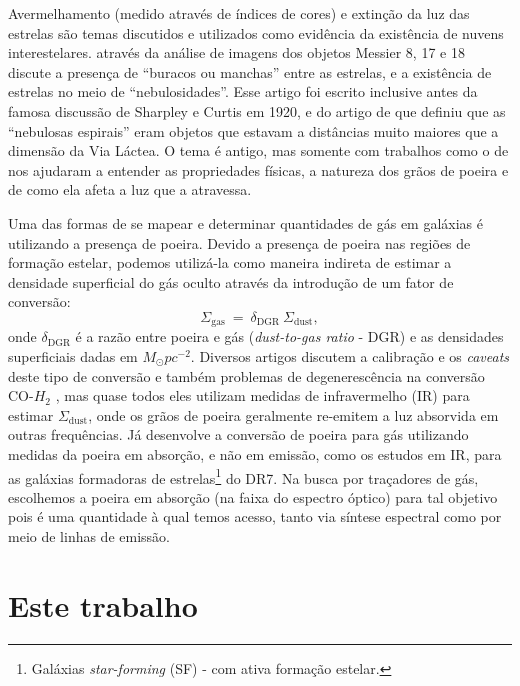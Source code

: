 Avermelhamento (medido através de índices de cores) e extinção da luz das estrelas são temas
discutidos e utilizados como evidência da existência de nuvens interestelares. \citep{Barnard.1908a}
através da análise de imagens dos objetos Messier 8, 17 e 18 discute a presença de ``buracos ou
manchas'' entre as estrelas, e a existência de estrelas no meio de ``nebulosidades''. Esse artigo
foi escrito inclusive antes da famosa discussão de Sharpley e Curtis em 1920, e do artigo de
\citep{Hubble.1925a} que definiu que as ``nebulosas espirais'' eram objetos que estavam a distâncias
muito maiores que a dimensão da Via Láctea. O tema é antigo, mas somente com trabalhos como o de
\citep{Draine.2003a} nos ajudaram a entender as propriedades físicas, a natureza dos grãos de
poeira e de como ela afeta a luz que a atravessa.

Uma das formas de se mapear e determinar quantidades de gás em galáxias é utilizando a presença de
poeira. Devido a presença de poeira nas regiões de formação estelar, podemos utilizá-la como maneira
indireta de estimar a densidade superficial do gás oculto através da introdução de um fator de
conversão:
\begin{equation}
	\label{eq:dust2gas}
	\Sigma_{\mathrm{gas}}\ =\ \delta_{\mathrm{DGR}}\ \Sigma_{\mathrm{dust}}, 
\end{equation}
\noinden onde $\delta_{\mathrm{DGR}}$ é a razão entre poeira e gás ({\em dust-to-gas ratio} - DGR) e
as densidades superficiais dadas em $M_\odot pc^{-2}$. Diversos artigos discutem a calibração e
os {\em caveats} deste tipo de conversão e também problemas de degenerescência na conversão CO-$H_2$
\citep{Guiderdoni.Rocca.1987, Leroy.etal.2011a, Leroy.etal.2013a, RemyRuyer.etal.2014a}, mas quase
todos eles utilizam medidas de infravermelho (IR) para estimar $\Sigma_{\mathrm{dust}}$, onde os
grãos de poeira geralmente re-emitem a luz absorvida em outras frequências. Já
\citet{Brinchmann.etal.2013a} desenvolve a conversão de poeira para gás utilizando medidas da poeira
em absorção, e não em emissão, como os estudos em IR, para as galáxias formadoras de
estrelas\footnote{Galáxias {\em star-forming} (SF) - com ativa formação estelar.} do \SDSS DR7.
Na busca por traçadores de gás, escolhemos a poeira em absorção (na faixa do espectro óptico) para
tal objetivo pois é uma quantidade à qual temos acesso, tanto via síntese espectral como por meio
de linhas de emissão.

\section{Este trabalho}
\label{sec:intro:estetrabalho}

